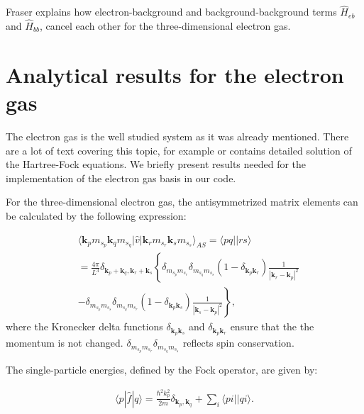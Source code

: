 \documentclass[twoside,english]{uiofysmaster}
\begin{document}
Fraser \cite{FraserFinitesizeeffectsCoulomb1996} explains how electron-background and background-background terms $\hat{H}_{eb}$ and $\hat{H}_{bb}$, cancel each other for the three-dimensional electron gas.


\section{Analytical results for the electron gas}

The electron gas is the well studied system as it was already mentioned. There are a lot of text covering this topic,
for example \cite{GrossManyparticletheory1991} or \cite{S.KvaalLectureNotesFysKjm44802015} contains detailed solution of the Hartree-Fock equations. We briefly present results needed for the implementation of the electron gas basis in our code.

For the three-dimensional electron gas, the antisymmetrized matrix elements can be calculated by the following expression:

 \begin{align}\label{TBMEHEG} \tag{5}
 & \langle \mathbf{k}_{p}m_{s_{p}}\mathbf{k}_{q}m_{s_{q}}
 |\hat{v}|\mathbf{k}_{r}m_{s_{r}}\mathbf{k}_{s}m_{s_{s}}\rangle_{AS} = \langle pq||rs \rangle
 \nonumber \\
 & = \frac{4\pi }{L^{3}}\delta_{\mathbf{k}_{p}+\mathbf{k}_{q},
 	\mathbf{k}_{r}+\mathbf{k}_{s}}\left\{ 
 \delta_{m_{s_{p}}m_{s_{r}}}\delta_{m_{s_{q}}m_{s_{s}}}
 \left( 1 - \delta_{\mathbf{k}_{p}\mathbf{k}_{r}}\right) 
 \frac{1}{|\mathbf{k}_{r}-\mathbf{k}_{p}|^{2}}
 \right. \nonumber \\
 & \left. - \delta_{m_{s_{p}}m_{s_{s}}}\delta_{m_{s_{q}}m_{s_{r}}}
 \left( 1 - \delta_{\mathbf{k}_{p}\mathbf{k}_{s}} \right)
 \frac{1}{|\mathbf{k}_{s}-\mathbf{k}_{p}|^{2}} 
 \right\} ,
 \end{align}
where the Kronecker delta functions $\delta_{\mathbf{k}_{p}\mathbf{k}_{s}}$  and $\delta_{\mathbf{k}_{p}\mathbf{k}_{r}}$ ensure that the the momentum is not changed. $\delta_{m_{s_{p}}m_{s_{r}}}\delta_{m_{s_{q}}m_{s_{s}}}$ reflects spin conservation.

The single-particle energies, defined by the Fock operator, are given by: 

\begin{align}
\langle p|\hat{f}|q \rangle
= \frac{\hbar^{2}k_{p}^{2}}{2m}\delta_{\mathbf{k}_{p},
	\mathbf{k}_{q}} + \sum_{i}\langle pi||qi \rangle.
\tag{7}
\end{align}
\end{document}
